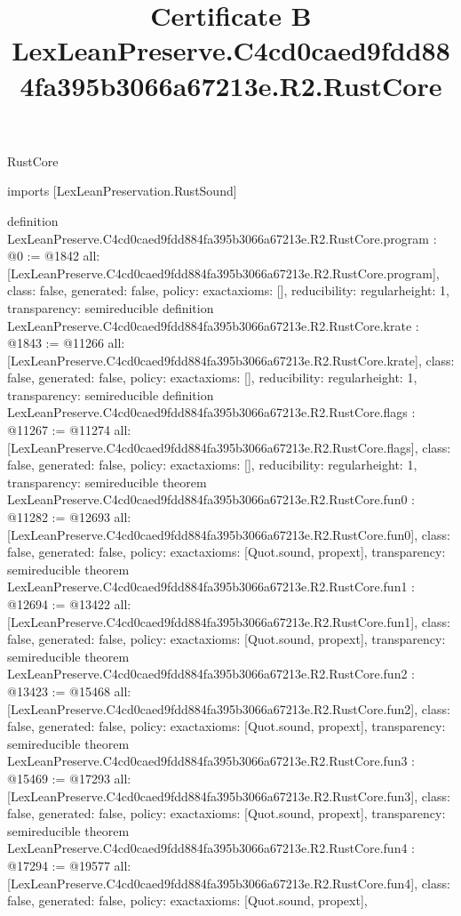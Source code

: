\begin{lexlean}{RustCore}
\title{Certificate B LexLeanPreserve.C4cd0caed9fdd884fa395b3066a67213e.R2.RustCore}
\begin{coremodule}
imports [LexLeanPreservation.RustSound]

definition LexLeanPreserve.C4cd0caed9fdd884fa395b3066a67213e.R2.RustCore.program : @0 := @1842 {
  all: [LexLeanPreserve.C4cd0caed9fdd884fa395b3066a67213e.R2.RustCore.program],
  class: false,
  generated: false,
  policy: exact{axioms: []},
  reducibility: regular{height: 1},
  transparency: semireducible
}
definition LexLeanPreserve.C4cd0caed9fdd884fa395b3066a67213e.R2.RustCore.krate : @1843 := @11266 {
  all: [LexLeanPreserve.C4cd0caed9fdd884fa395b3066a67213e.R2.RustCore.krate],
  class: false,
  generated: false,
  policy: exact{axioms: []},
  reducibility: regular{height: 1},
  transparency: semireducible
}
definition LexLeanPreserve.C4cd0caed9fdd884fa395b3066a67213e.R2.RustCore.flags : @11267 := @11274 {
  all: [LexLeanPreserve.C4cd0caed9fdd884fa395b3066a67213e.R2.RustCore.flags],
  class: false,
  generated: false,
  policy: exact{axioms: []},
  reducibility: regular{height: 1},
  transparency: semireducible
}
theorem LexLeanPreserve.C4cd0caed9fdd884fa395b3066a67213e.R2.RustCore.fun0 : @11282 := @12693 {
  all: [LexLeanPreserve.C4cd0caed9fdd884fa395b3066a67213e.R2.RustCore.fun0],
  class: false,
  generated: false,
  policy: exact{axioms: [Quot.sound, propext]},
  transparency: semireducible
}
theorem LexLeanPreserve.C4cd0caed9fdd884fa395b3066a67213e.R2.RustCore.fun1 : @12694 := @13422 {
  all: [LexLeanPreserve.C4cd0caed9fdd884fa395b3066a67213e.R2.RustCore.fun1],
  class: false,
  generated: false,
  policy: exact{axioms: [Quot.sound, propext]},
  transparency: semireducible
}
theorem LexLeanPreserve.C4cd0caed9fdd884fa395b3066a67213e.R2.RustCore.fun2 : @13423 := @15468 {
  all: [LexLeanPreserve.C4cd0caed9fdd884fa395b3066a67213e.R2.RustCore.fun2],
  class: false,
  generated: false,
  policy: exact{axioms: [Quot.sound, propext]},
  transparency: semireducible
}
theorem LexLeanPreserve.C4cd0caed9fdd884fa395b3066a67213e.R2.RustCore.fun3 : @15469 := @17293 {
  all: [LexLeanPreserve.C4cd0caed9fdd884fa395b3066a67213e.R2.RustCore.fun3],
  class: false,
  generated: false,
  policy: exact{axioms: [Quot.sound, propext]},
  transparency: semireducible
}
theorem LexLeanPreserve.C4cd0caed9fdd884fa395b3066a67213e.R2.RustCore.fun4 : @17294 := @19577 {
  all: [LexLeanPreserve.C4cd0caed9fdd884fa395b3066a67213e.R2.RustCore.fun4],
  class: false,
  generated: false,
  policy: exact{axioms: [Quot.sound, propext]},
}
\end{coremodule}
\end{lexlean}
